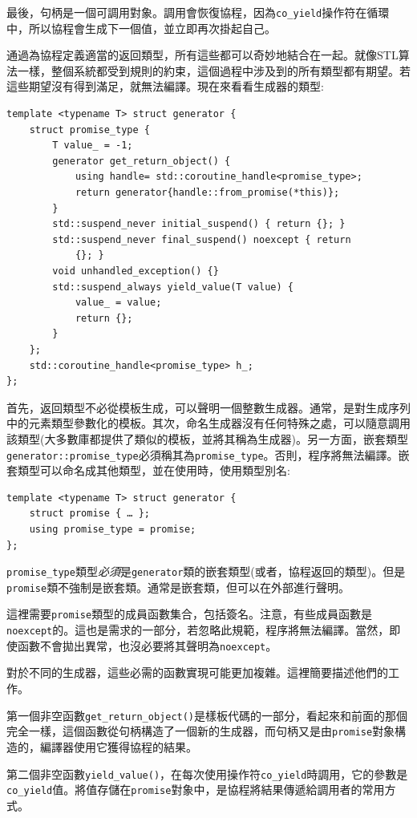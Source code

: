 最後，句柄是一個可調用對象。調用會恢復協程，因為\texttt{co\_yield}操作符在循環中，所以協程會生成下一個值，並立即再次掛起自己。 

通過為協程定義適當的返回類型，所有這些都可以奇妙地結合在一起。就像STL算法一樣，整個系統都受到規則的約束，這個過程中涉及到的所有類型都有期望。若這些期望沒有得到滿足，就無法編譯。現在來看看生成器的類型:

\begin{lstlisting}[style=styleCXX]
template <typename T> struct generator {
	struct promise_type {
		T value_ = -1;
		generator get_return_object() {
			using handle= std::coroutine_handle<promise_type>;
			return generator{handle::from_promise(*this)};
		}
		std::suspend_never initial_suspend() { return {}; }
		std::suspend_never final_suspend() noexcept { return 
			{}; }
		void unhandled_exception() {}
		std::suspend_always yield_value(T value) {
			value_ = value;
			return {};
		}
	};
	std::coroutine_handle<promise_type> h_;
};
\end{lstlisting}

首先，返回類型不必從模板生成，可以聲明一個整數生成器。通常，是對生成序列中的元素類型參數化的模板。其次，命名生成器沒有任何特殊之處，可以隨意調用該類型(大多數庫都提供了類似的模板，並將其稱為生成器)。另一方面，嵌套類型\texttt{generator::promise\_type}必須稱其為\texttt{promise\_type}。否則，程序將無法編譯。嵌套類型可以命名成其他類型，並在使用時，使用類型別名:

\begin{lstlisting}[style=styleCXX]
template <typename T> struct generator {
	struct promise { … };
	using promise_type = promise;
};
\end{lstlisting}

\texttt{promise\_type}類型\textit{必須}是\texttt{generator}類的嵌套類型(或者，協程返回的類型)。但是\texttt{promise}類不強制是嵌套類。通常是嵌套類，但可以在外部進行聲明。 

這裡需要\texttt{promise}類型的成員函數集合，包括簽名。注意，有些成員函數是\texttt{noexcept}的。這也是需求的一部分，若忽略此規範，程序將無法編譯。當然，即使函數不會拋出異常，也沒必要將其聲明為\texttt{noexcept}。 

對於不同的生成器，這些必需的函數實現可能更加複雜。這裡簡要描述他們的工作。

第一個非空函數\texttt{get\_return\_object()}是樣板代碼的一部分，看起來和前面的那個完全一樣，這個函數從句柄構造了一個新的生成器，而句柄又是由\texttt{promise}對象構造的，編譯器使用它獲得協程的結果。 

第二個非空函數\texttt{yield\_value()}，在每次使用操作符\texttt{co\_yield}時調用，它的參數是\texttt{co\_yield}值。將值存儲在\texttt{promise}對象中，是協程將結果傳遞給調用者的常用方式。 

